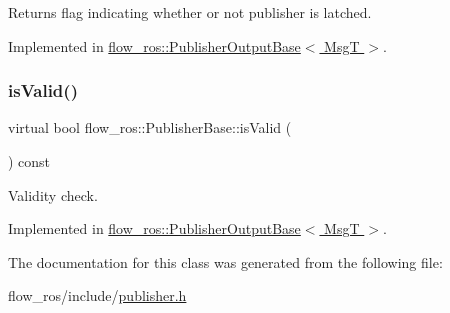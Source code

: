 Returns flag indicating whether or not publisher is latched. 



Implemented in \hyperlink{classflow__ros_1_1_publisher_output_base_a34acf851a9aa31ece46b6b5887b3db24}{flow\+\_\+ros\+::\+Publisher\+Output\+Base$<$ Msg\+T $>$}.

\mbox{\label{classflow__ros_1_1_publisher_base_ac9bc27703de2394a0e1f3df7dac93548}} 
\subsubsection{\texorpdfstring{is\+Valid()}{isValid()}}
{\footnotesize\ttfamily virtual bool flow\+\_\+ros\+::\+Publisher\+Base\+::is\+Valid (\begin{DoxyParamCaption}{ }\end{DoxyParamCaption}) const\hspace{0.3cm}{\ttfamily [pure virtual]}}



Validity check. 



Implemented in \hyperlink{classflow__ros_1_1_publisher_output_base_a60ffa435ac1243b046d8029584c097a3}{flow\+\_\+ros\+::\+Publisher\+Output\+Base$<$ Msg\+T $>$}.



The documentation for this class was generated from the following file\+:\begin{DoxyCompactItemize}
\item 
flow\+\_\+ros/include/\hyperlink{publisher_8h}{publisher.\+h}\end{DoxyCompactItemize}
